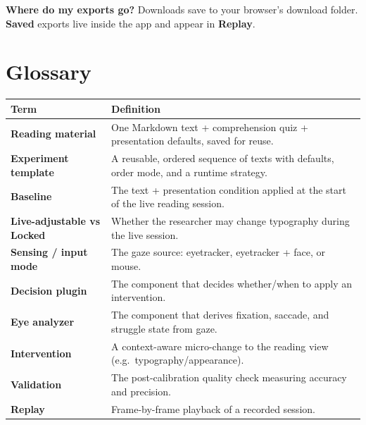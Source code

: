 \textbf{Where do my exports go?}
Downloads save to your browser's download folder. \textbf{Saved} exports live inside the app and appear
in \textbf{Replay}.

\FloatBarrier
\section{Glossary}\label{10-glossary}

{\small{} %
\begin{longtable}[]{@{}
  >{\raggedright\arraybackslash}p{}
  >{\raggedright\arraybackslash}p{}@{}}
\toprule\noalign{}
\begin{minipage}[b]{\linewidth}\raggedright
Term
\end{minipage} & \begin{minipage}[b]{\linewidth}\raggedright
Definition
\end{minipage} \\
\midrule\noalign{}
\endhead
\bottomrule\noalign{}
\endlastfoot
\textbf{Reading material} & One Markdown text + comprehension quiz + presentation defaults, saved for reuse. \\
\textbf{Experiment template} & A reusable, ordered sequence of texts with defaults, order mode, and a runtime strategy. \\
\textbf{Baseline} & The text + presentation condition applied at the start of the live reading session. \\
\textbf{Live-adjustable vs Locked} & Whether the researcher may change typography during the live session. \\
\textbf{Sensing / input mode} & The gaze source: eyetracker, eyetracker + face, or mouse. \\
\textbf{Decision plugin} & The component that decides whether/when to apply an intervention. \\
\textbf{Eye analyzer} & The component that derives fixation, saccade, and struggle state from gaze. \\
\textbf{Intervention} & A context-aware micro-change to the reading view (e.g.~typography/appearance). \\
\textbf{Validation} & The post-calibration quality check measuring accuracy and precision. \\
\textbf{Replay} & Frame-by-frame playback of a recorded session. \\
\end{longtable}
}
